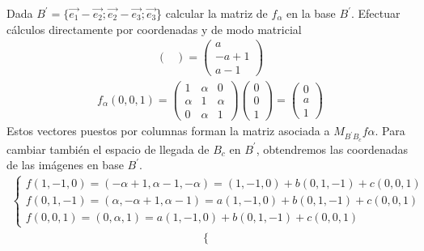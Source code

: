 \documentclass[11pt]{article}
\begin{document}
\begin{question}
\begin{subquestion}{Dada $B^{'}=\{\Vec{e_{1}}-\Vec{e_{2}};\Vec{e_{2}}-\Vec{e_{3}};\Vec{e_{3}}$\} calcular la matriz de $f_{\alpha}$ en la base $B^{'}$. Efectuar cálculos directamente por coordenadas y de modo matricial}
{\begin{align*}
\begin{pmatrix}
                \end{pmatrix}=
                    \begin{pmatrix}
                        a \\
                        -a+1 \\
                        a-1
                    \end{pmatrix}
            \end{align*}
            \begin{align*}
                f_{\alpha}(0,0,1) = 
                \begin{pmatrix}
                    1   &   \alpha  &   0\\
                    \alpha  &   1   &   \alpha\\
                    0   &   \alpha  &   1
                \end{pmatrix} 
                \begin{pmatrix}
                    0\\
                    0\\
                    1
                \end{pmatrix}=
                \begin{pmatrix}
                    0 \\
                    a \\
                    1
                \end{pmatrix}
            \end{align*}
            Estos vectores puestos por columnas forman la matriz asociada a $M_{B^{'}{B_{c}}}f{\alpha}$.
            \newline
            Para cambiar también el espacio de llegada de $B_{c}$ en $B^{'}$, obtendremos las coordenadas de las imágenes en base $B^{'}$.
            \begin{align*}
                \begin{cases}
                    f(1,-1,0)=(-\alpha+1,\alpha-1,-\alpha)=(1,-1,0)+b(0,1,-1)+c(0,0,1)\\
                    f(0,1,-1)=(\alpha,-\alpha+1,\alpha-1)=a(1,-1,0)+b(0,1,-1)+c(0,0,1)\\
                    f(0,0,1)=(0,\alpha,1)=a(1,-1,0)+b(0,1,-1)+c(0,0,1)
                \end{cases}
            \end{align*}
            \begin{align*}
                \begin{cases}

\end{cases}
\end{align*}}
\end{subquestion}
\end{question}
\end{document}
